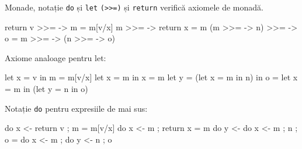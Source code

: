 \documentclass[xcolor=pdftex,romanian,colorlinks]{beamer}
\begin{document}
%
%
\begin{frame}[fragile]{}
\begin{asciihs}
\end{asciihs}
\end{frame}

%
\begin{frame}[fragile]{Monade, notație \lstinline$do$ și \lstinline$let$}
\lstinline$(>>=)$ și \lstinline$return$ verifică axiomele de monadă.
\begin{asciihs}
  return v >>= \x -> m        =  m[v/x]
  m >>= \x -> return x        =  m
  (m >>= \x -> n) >>= \y-> o  =  m >>= \x -> (n >>= \y -> o)
\end{asciihs}

%
Axiome analoage pentru let:
\begin{asciihs}
   let x = v in m   =   m[v/x]
   let x = m in x   =   m
   let y = (let x = m in n) in o
                    =   let x = m in (let y = n in o)
\end{asciihs}

Notație \lstinline$do$ pentru expresiile de mai sus:
\begin{asciihs}
  do {x <- return v ; m}         =  m[v/x] 
  do {x <- m ; return x}         =  m
  do {y <- do {x <- m ; n} ; o}  =  do {x <- m ; 
                                        do {y <- n ; o}}
\end{asciihs}

\end{frame}
\end{document}
